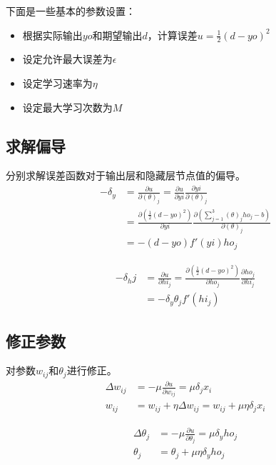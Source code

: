 \documentclass[12pt]{article}
\begin{document}
\indent 下面是一些基本的参数设置：

\begin{itemize}
\item 根据实际输出$yo$和期望输出$d$，计算误差$u=\frac{1}{2}(d - yo)^2$
\item 设定允许最大误差为$\epsilon$
\item 设定学习速率为$\eta$
\item 设定最大学习次数为$M$
\end{itemize}

\subsection{求解偏导}

分别求解误差函数对于输出层和隐藏层节点值的偏导。\\

\begin{align}
-\delta_y &= \frac{\partial u}{\partial (\theta)_j} = \frac{\partial u}{\partial yi} \frac{\partial yi}{\partial (\theta)_j} \nonumber \\
&= \frac{\partial (\frac{1}{2}(d - yo)^2)}{\partial yi} \frac{\partial (\sum_{j=1}^3 (\theta)_j ho_j - b)}{\partial (\theta)_j} \nonumber \\
&= -(d - yo) f'(yi) ho_j
\end{align}

\begin{align}
-\delta_hj &= \frac{\partial u}{\partial hi_j} = \frac{\partial (\frac{1}{2}(d - yo)^2)}{\partial ho_j} \frac{\partial ho_j}{\partial hi_j} \nonumber \\
&= -\delta_y \theta_j f'(hi_j)
\end{align}

\subsection{修正参数}

对参数$w_{ij}$和$\theta_j$进行修正。\\

\begin{align}
\Delta w_{ij} &= - \mu \frac{\partial u}{\partial w_{ij}} = \mu \delta_j x_i\\
w_{ij} &= w_{ij} + \eta \Delta w_{ij} = w_{ij} + \mu \eta \delta_j x_i
\end{align}

\begin{align}
\Delta \theta_j &= - \mu \frac{\partial u}{\partial \theta_j} = \mu \delta_y ho_j\\
\theta_j &= \theta_j + \mu \eta \delta_y ho_j
\end{align}
\end{document}
